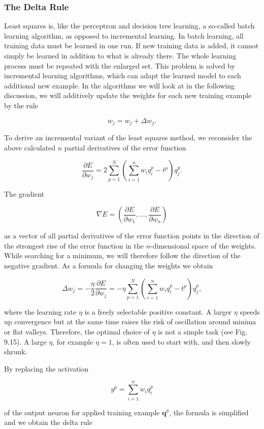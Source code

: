 \documentclass[10pt]{article}
\begin{document}
\subsubsection*{The Delta Rule}
Least squares is, like the perceptron and decision tree learning, a so-called batch learning algorithm, as opposed to incremental learning. In batch learning, all training data must be learned in one run. If new training data is added, it cannot simply be learned in addition to what is already there. The whole learning process must be repeated with the enlarged set. This problem is solved by incremental learning algorithms, which can adapt the learned model to each additional new example. In the algorithms we will look at in the following discussion, we will additively update the weights for each new training example by the rule

$$
w_{j}=w_{j}+\Delta w_{j} .
$$

To derive an incremental variant of the least squares method, we reconsider the above calculated $n$ partial derivatives of the error function

$$
\frac{\partial E}{\partial w_{j}}=2 \sum_{p=1}^{N}\left(\sum_{i=1}^{n} w_{i} q_{i}^{p}-t^{p}\right) q_{j}^{p} .
$$

The gradient

$$
\nabla E=\left(\frac{\partial E}{\partial w_{1}}, \ldots, \frac{\partial E}{\partial w_{n}}\right)
$$

as a vector of all partial derivatives of the error function points in the direction of the strongest rise of the error function in the $n$-dimensional space of the weights. While searching for a minimum, we will therefore follow the direction of the negative gradient. As a formula for changing the weights we obtain

$$
\Delta w_{j}=-\frac{\eta}{2} \frac{\partial E}{\partial w_{j}}=-\eta \sum_{p=1}^{N}\left(\sum_{i=1}^{n} w_{i} q_{i}^{p}-t^{p}\right) q_{j}^{p},
$$

where the learning rate $\eta$ is a freely selectable positive constant. A larger $\eta$ speeds up convergence but at the same time raises the risk of oscillation around minima or flat valleys. Therefore, the optimal choice of $\eta$ is not a simple task (see Fig. 9.15). A large $\eta$, for example $\eta=1$, is often used to start with, and then slowly shrunk.

By replacing the activation

$$
y^{p}=\sum_{i=1}^{n} w_{i} q_{i}^{p}
$$

of the output neuron for applied training example $\boldsymbol{q}^{p}$, the formula is simplified and we obtain the delta rule
\end{document}

